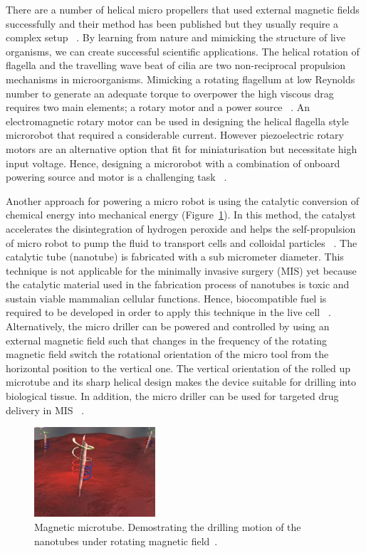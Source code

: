 \documentclass[a4paper,11pt]{article}
\begin{document}
\begin{sloppypar}
There are a number of helical micro propellers that used external magnetic fields successfully and their
 method has been published but they usually require a complex setup ~\citep{qiunanohelices}. 
By learning from nature and mimicking the structure of live organisms, we can create successful  
scientific applications. 
The helical rotation of flagella and the travelling wave beat of cilia are two non-reciprocal propulsion
 mechanisms in microorganisms. Mimicking a rotating flagellum at low Reynolds number to generate an 
adequate torque to overpower the high viscous drag requires two main elements; a rotary motor and a
 power source ~\citep{qiunanohelices}. 
An electromagnetic rotary motor can be used in designing the helical flagella style microrobot that 
required a considerable current. However piezoelectric rotary motors are an alternative option 
that fit for miniaturisation but necessitate high input voltage.  Hence, designing a microrobot with a 
combination of onboard powering source and motor is a challenging task ~\citep{qiunanohelices}. 

Another approach for powering a micro robot is using the catalytic conversion of chemical energy
 into mechanical energy (Figure~\ref{nanotube}). In this method, the catalyst accelerates the disintegration of hydrogen peroxide
 and helps the self-propulsion of micro robot to pump the fluid to transport cells and colloidal 
particles ~\citep{C2NR32798H}.
The catalytic tube (nanotube) is fabricated with a sub micrometer diameter.
 This technique is not applicable for the minimally invasive surgery (MIS) yet because the catalytic
 material used in the fabrication process of nanotubes is toxic and sustain viable mammalian cellular 
functions. Hence, biocompatible fuel is required to be developed in order to apply this technique in the 
live cell ~\citep{C2NR32798H}.
Alternatively, the micro driller can be powered and controlled by using an external magnetic field 
such that changes in the frequency of the rotating magnetic field switch the rotational orientation of the 
micro tool from the horizontal position to the vertical one. The vertical orientation of the rolled up microtube 
and its sharp helical design makes the device suitable for drilling into biological tissue. In addition, the micro 
driller can be used for targeted drug delivery in MIS ~\citep{C2NR32798H}. 

\begin{figure}
  \centering
    \includegraphics[width=0.4\textwidth]{nanoJet3}
  \caption{Magnetic microtube. Demostrating the drilling motion of the nanotubes under rotating
 magnetic field~\citep{C2NR32798H}.}
  \label{nanotube}
\end{figure}
  

\end{sloppypar}
\end{document}
